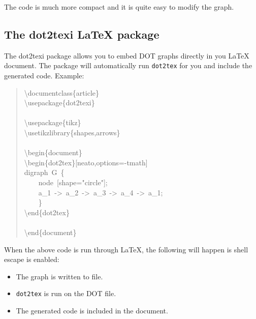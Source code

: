\documentclass[10pt,a4paper,english]{article}
\begin{document}
The code is much more compact and it is quite easy to modify the graph.



\hypertarget{the-dot2texi-latex-package}{}
\subsection*{The dot2texi LaTeX package}
\label{the-dot2texi-latex-package}

The dot2texi package allows you to embed DOT graphs directly in you LaTeX document. The package will automatically run \texttt{dot2tex} for you and include the generated code. Example:
\begin{quote}{\ttfamily \raggedright \noindent
{\textbackslash}documentclass{\{}article{\}}~\\
{\textbackslash}usepackage{\{}dot2texi{\}}~\\
~\\
{\textbackslash}usepackage{\{}tikz{\}}~\\
{\textbackslash}usetikzlibrary{\{}shapes,arrows{\}}~\\
~\\
{\textbackslash}begin{\{}document{\}}~\\
{\textbackslash}begin{\{}dot2tex{\}}{[}neato,options=-tmath{]}~\\
digraph~G~{\{}~\\
~~~~node~{[}shape="circle"{]};~\\
~~~~a{\_}1~->~a{\_}2~->~a{\_}3~->~a{\_}4~->~a{\_}1;~\\
~~~~{\}}~\\
{\textbackslash}end{\{}dot2tex{\}}~\\
~\\
{\textbackslash}end{\{}document{\}}
}\end{quote}

When the above code is run through LaTeX, the following will happen is shell escape is enabled:
\begin{itemize}
\item {} 
The graph is written to file.

\item {} 
\texttt{dot2tex} is run on the DOT file.

\item {} 
The generated code is included in the document.

\end{itemize}
\end{document}
